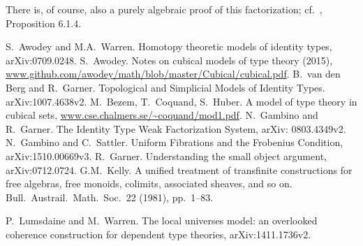 \documentclass[12pt]{article}
\theoremstyle{remark}
\theoremstyle{definition}
\begin{document}
There is, of course, also a purely algebraic proof of this factorization; cf.~\cite{GvdB}, Proposition 6.1.4.

\begin{thebibliography}{300}

S.~Awodey and M.A.~Warren. Homotopy theoretic models of identity types, arXiv:0709.0248.
%
S.~Awodey. Notes on cubical models of type theory (2015), \url{www.github.com/awodey/math/blob/master/Cubical/cubical.pdf}.
%
B.~van den Berg and R.~Garner. Topological and Simplicial Models of Identity Types.  arXiv:1007.4638v2.
%
M.~Bezem, T.~Coquand, S.~Huber. A model of type theory in cubical sets, \url{www.cse.chalmers.se/~coquand/mod1.pdf}.
%
N.~Gambino and R.~Garner. The Identity Type Weak Factorization System, arXiv: 0803.4349v2.
%
N.~Gambino and C.~Sattler. Uniform Fibrations and the Frobenius Condition, arXiv:1510.00669v3.
%
R.~Garner. Understanding the small object argument, arXiv:0712.0724.
%
G.M.~Kelly. A unified treatment of transfinite constructions for free algebras, free monoids, colimits, associated sheaves, and so on. Bull.\ Austrail.\ Math.\ Soc.\ 22 (1981), pp.~1--83.%

  P.~Lumsdaine and M.~Warren.  The local universes model: an overlooked coherence construction for dependent type theories, arXiv:1411.1736v2.
\end{thebibliography}

\end{document}
